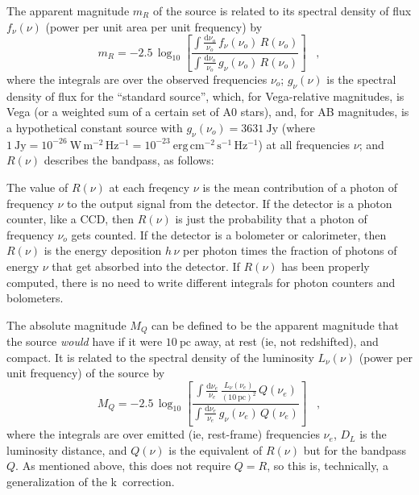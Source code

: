 \documentclass[preprint]{aastex}
\begin{document}
The apparent magnitude $m_R$ of the source is related to its spectral
density of flux $f_{\nu}(\nu)$ (power per unit area per unit
frequency) by
\begin{equation}
m_R = -2.5\,\log_{10}\left[
  \frac{\displaystyle
          \int\frac{\mathrm{d}\nu_o}{\nu_o}\,f_{\nu}(\nu_o)\,R(\nu_o)}
       {\displaystyle
          \int\frac{\mathrm{d}\nu_o}{\nu_o}\,g_{\nu}(\nu_o)\,R(\nu_o)}
\right] \;\;\;,
\end{equation}
where the integrals are over the observed frequencies $\nu_o$;
$g_{\nu}(\nu)$ is the spectral density of flux for the ``standard
source'', which, for Vega-relative magnitudes, is Vega (or a weighted
sum of a certain set of A0 stars), and, for AB magnitudes, is a
hypothetical constant source with $g_{\nu}(\nu_o)=3631~\mathrm{Jy}$
(where $1~\mathrm{Jy}= 10^{-26}~\mathrm{W\,m^{-2}\,Hz^{-1}}=
10^{-23}~\mathrm{erg\,cm^{-2}\,s^{-1}\,Hz^{-1}}$) at all frequencies
$\nu$; and $R(\nu)$ describes the bandpass, as follows:

The value of $R(\nu)$ at each freqency $\nu$ is the mean contribution
of a photon of frequency $\nu$ to the output signal from the detector.
If the detector is a photon counter, like a CCD, then $R(\nu)$ is just
the probability that a photon of frequency $\nu_o$ gets counted.  If
the detector is a bolometer or calorimeter, then $R(\nu)$ is the
energy deposition $h\,\nu$ per photon times the fraction of photons of
energy $\nu$ that get absorbed into the detector.  If $R(\nu)$ has
been properly computed, there is no need to write different integrals
for photon counters and bolometers.

The absolute magnitude $M_Q$ can be defined to be the apparent
magnitude that the source \emph{would} have if it were
$10~\mathrm{pc}$ away, at rest (ie, not redshifted), and compact.  It
is related to the spectral density of the luminosity $L_{\nu}(\nu)$
(power per unit frequency) of the source by
\begin{equation}
M_Q = -2.5\,\log_{10}\left[
  \frac{\displaystyle
          \int\frac{\mathrm{d}\nu_e}{\nu_e}\,
              \frac{L_{\nu}(\nu_e)}{(10~\mathrm{pc})^2}\,Q(\nu_e)}
       {\displaystyle
          \int\frac{\mathrm{d}\nu_e}{\nu_e}\,g_{\nu}(\nu_e)\,Q(\nu_e)}
\right] \;\;\;,
\end{equation}
where the integrals are over emitted (ie, rest-frame) frequencies
$\nu_e$, $D_L$ is the luminosity distance, and $Q(\nu)$ is the
equivalent of $R(\nu)$ but for the bandpass $Q$.  As mentioned above,
this does not require $Q=R$, so this is, technically, a generalization
of the k~correction.
\end{document}
